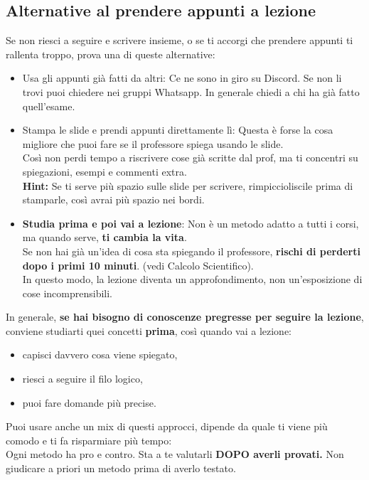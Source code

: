 \documentclass{article}
\begin{document}
\subsection{Alternative al prendere appunti a lezione}
Se non riesci a seguire e scrivere insieme, o se ti accorgi che prendere appunti ti rallenta troppo, prova una di queste alternative:
\begin{itemize}
\item Usa gli appunti già fatti da altri: Ce ne sono in giro su Discord. Se non li trovi puoi chiedere nei gruppi Whatsapp. In generale chiedi a chi ha già fatto quell'esame.
\item Stampa le slide e prendi appunti direttamente lì: Questa è forse la cosa migliore che puoi fare se il professore spiega usando le slide.\\
  Così non perdi tempo a riscrivere cose già scritte dal prof, ma ti concentri su spiegazioni, esempi e commenti extra.\\
  \textbf{Hint:} Se ti serve più spazio sulle slide per scrivere, rimpiccioliscile prima di stamparle, così avrai più spazio nei bordi.
\item \textbf{Studia prima e poi vai a lezione}: Non è un metodo adatto a tutti i corsi, ma quando serve, \textbf{ti cambia la vita}.\\
  Se non hai già un'idea di cosa sta spiegando il professore, \textbf{rischi di perderti dopo i primi 10 minuti}. (vedi Calcolo Scientifico).\\
  In questo modo, la lezione diventa un approfondimento, non un'esposizione di cose incomprensibili.
\end{itemize}
In generale, \textbf{se hai bisogno di conoscenze pregresse per seguire la lezione}, conviene studiarti quei concetti \textbf{prima}, così quando vai a lezione:
\begin{itemize}
\item capisci davvero cosa viene spiegato,
\item riesci a seguire il filo logico,
\item puoi fare domande più precise.
\end{itemize}
Puoi usare anche un mix di questi approcci, dipende da quale ti viene più comodo e ti fa risparmiare più tempo:\\
Ogni metodo ha pro e contro. Sta a te valutarli \textbf{DOPO averli provati.} Non giudicare a priori un metodo prima di averlo testato.
\end{document}
